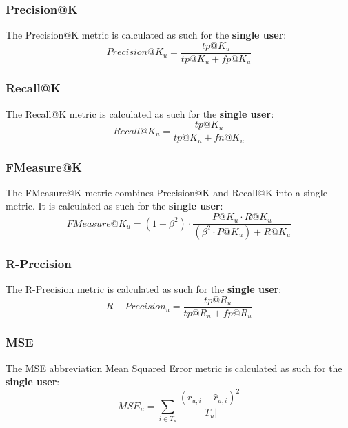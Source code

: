 \documentclass[11pt]{article}
\begin{document}

\subsubsection{Precision@K}\label{subsubsec:prec-k}
The Precision@K metric is calculated as such for the \textbf{single user}:
\hfill\break
\hfill\break
    \[
        Precision@K_u = \frac{tp@K_u}{tp@K_u + fp@K_u}
    \]


\subsubsection{Recall@K}\label{subsubsec:rec-k}
The Recall@K metric is calculated as such for the \textbf{single user}:
\hfill\break
\hfill\break
    \[
        Recall@K_u = \frac{tp@K_u}{tp@K_u + fn@K_u}
    \]


\subsubsection{FMeasure@K}\label{subsubsec:f-meas-k}
The FMeasure@K metric combines Precision@K and Recall@K into a single metric.
It is calculated as such for the \textbf{single user}:
\hfill\break
\hfill\break
    \[
        FMeasure@K_u = (1 + \beta^2) \cdot \frac{P@K_u \cdot R@K_u}{(\beta^2 \cdot P@K_u) + R@K_u}
    \]


\subsubsection{R-Precision}\label{subsubsec:r-prec}
The R-Precision metric is calculated as such for the \textbf{single user}:
\hfill\break
\hfill\break
    \[
        R-Precision_u = \frac{tp@R_u}{tp@R_u + fp@R_u}
    \]


\subsubsection{MSE}\label{subsubsec:mse}
The MSE abbreviation Mean Squared Error metric is calculated as such for the \textbf{single user}:
\hfill\break
\hfill\break
    \[
        MSE_u = \sum_{i \in T_u} \frac{(r_{u,i} - \hat{r}_{u,i})^2}{|T_u|}
    \]
\end{document}
